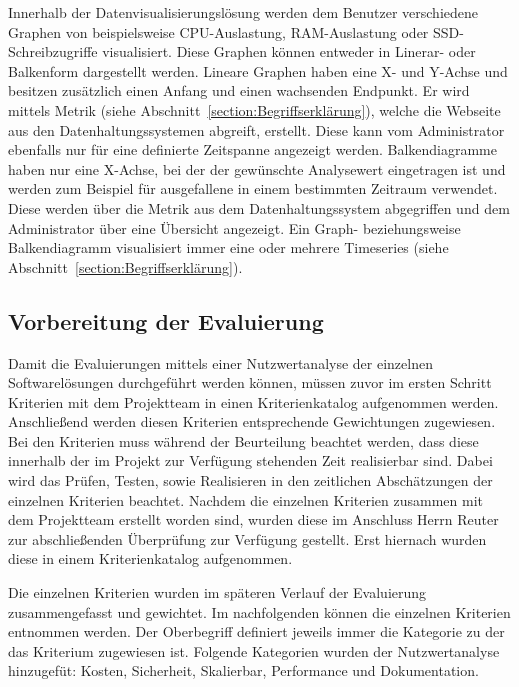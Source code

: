 Innerhalb der Datenvisualisierungslösung werden dem Benutzer verschiedene
Graphen von beispielsweise CPU\hyp{}Auslastung, RAM\hyp{}Auslastung oder
\gls{SSD}\hyp{}Schreibzugriffe visualisiert. Diese Graphen können entweder in
Linerar\hyp{} oder Balkenform dargestellt werden. Lineare Graphen haben eine
X\hyp{} und Y\hyp{}Achse und besitzen zusätzlich einen Anfang und einen
wachsenden Endpunkt. Er wird mittels Metrik (siehe
Abschnitt~\ref{section:Begriffserklärung}), welche die Webseite aus den
Datenhaltungssystemen abgreift, erstellt. Diese kann vom Administrator
ebenfalls nur für eine definierte Zeitspanne angezeigt werden. Balkendiagramme
haben nur eine X\hyp{}Achse, bei der der gewünschte Analysewert eingetragen ist
und werden zum Beispiel für ausgefallene  in einem
bestimmten Zeitraum verwendet. Diese werden über die Metrik aus dem
Datenhaltungssystem abgegriffen und dem Administrator über eine Übersicht
angezeigt. Ein Graph\hyp{} beziehungsweise Balkendiagramm visualisiert immer
eine oder mehrere Timeseries (siehe Abschnitt~\ref{section:Begriffserklärung}).
\mr%

\subsection{Vorbereitung der Evaluierung}
\label{subsec:vorbereiten_der_evaluierung_datenvisualisierung}
Damit die Evaluierungen mittels einer Nutzwertanalyse der einzelnen
Softwarelösungen durchgeführt werden können, müssen zuvor im ersten Schritt
Kriterien mit dem Projektteam in einen Kriterienkatalog aufgenommen werden.
Anschließend werden diesen Kriterien entsprechende Gewichtungen zugewiesen. Bei
den Kriterien muss während der Beurteilung beachtet werden, dass diese
innerhalb der im Projekt zur Verfügung stehenden Zeit realisierbar sind. Dabei
wird das Prüfen, Testen, sowie Realisieren in den zeitlichen Abschätzungen der
einzelnen Kriterien beachtet. Nachdem die einzelnen Kriterien zusammen mit dem
Projektteam erstellt worden sind, wurden diese im Anschluss Herrn Reuter zur
abschließenden Überprüfung zur Verfügung gestellt. Erst hiernach wurden diese
in einem Kriterienkatalog aufgenommen.

Die einzelnen Kriterien wurden im späteren Verlauf der Evaluierung
zusammengefasst und gewichtet. Im nachfolgenden können die einzelnen Kriterien
entnommen werden. Der Oberbegriff definiert jeweils immer die Kategorie zu der
das Kriterium zugewiesen ist. Folgende Kategorien wurden der Nutzwertanalyse
hinzugefüt: Kosten, Sicherheit, Skalierbar, Performance und Dokumentation.

